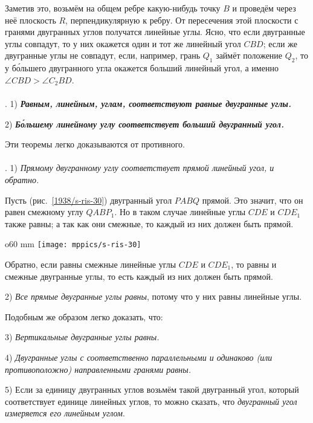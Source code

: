 Заметив это, возьмём на общем ребре какую-нибудь точку $B$ и проведём через неё плоскость $R$, перпендикулярную к ребру.
От пересечения этой плоскости с гранями двугранных углов получатся линейные углы.
Ясно, что если двугранные углы совпадут, то у них окажется один и тот же линейный угол $CBD$;
если же двугранные углы не совпадут, если, например, грань $Q_1$ займёт положение $Q_2$, то у б\'{о}льшего двугранного угла окажется больший линейный угол, а именно $\angle CBD > \angle C_2BD$.

\paragraph{}\label{1938/s40}
.
1) \textbf{\emph{Равным, линейным, углам, соответствуют равные двугранные углы.}}

2) \textbf{\emph{Б\'{о}льшему линейному углу соответствует больший двугранный угол.}}

Эти теоремы легко доказываются от противного.

\paragraph{}\label{1938/s41}
. 1) \emph{Прямому двугранному углу соответствует прямой линейный угол, и обратно.}

Пусть (рис.~\ref{1938/s-ris-30}) двугранный угол $PABQ$ прямой.
Это значит, что он равен смежному углу $QABP_1$.
Но в таком случае линейные углы $CDE$ и $CDE_1$ также равны;
а так как они смежные, то каждый из них должен быть прямой.

\begin{wrapfigure}{o}{60 mm}
\centering
\texttt{[image: mppics/s-ris-30]}
\caption{}\label{1938/s-ris-30}
\end{wrapfigure}

Обратно, если равны смежные линейные углы $CDE$ и $CDE_1$, то равны и смежные двугранные углы, то есть каждый из них должен быть прямой.

2) \emph{Все прямые двугранные углы равны}, потому что у них равны линейные углы.

Подобным же образом легко доказать, что:

3) \emph{Вертикальные двугранные углы равны.}

4) \emph{Двугранные углы с соответственно параллельными и одинаково (или противоположно) направленными гранями равны.}

5) Если за единицу двугранных углов возьмём такой двугранный угол, который соответствует единице линейных углов, то можно сказать, что \emph{двугранный угол измеряется его линейным углом}.


